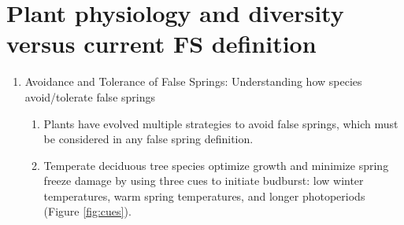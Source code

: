 \documentclass{article}\usepackage[]{graphicx}\usepackage[]{color}
\begin{document}
\section*{Plant physiology and diversity versus current FS definition}
\begin{enumerate}
\item Avoidance and Tolerance of False Springs: Understanding how species avoid/tolerate false springs 
\begin {enumerate}
\item Plants have evolved multiple strategies to avoid false springs, which must be considered in any false spring definition.
\item Temperate deciduous tree species optimize growth and minimize spring freeze damage by using three cues to initiate budburst: low winter temperatures, warm spring temperatures, and longer photoperiods \citep{Cleland2007, Polgar2011} (Figure \ref{fig:cues}).


\end{enumerate}
\end{enumerate}
\end{document}
